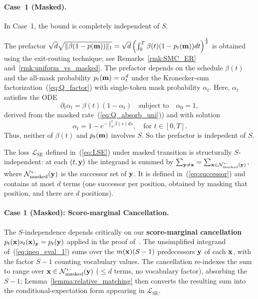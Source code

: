 \documentclass{article} %
\def\eqref#1{equation~\ref{#1}}
\newcommand{\bfx}{{\bf x}}
\newcommand{\bfy}{ {\bf y}}
\newcommand{\bfm}{{\bf m}}
\newcommand{\LSE}{\mathcal{L}_{\mathrm{SE}}}
\renewcommand{\eqref}[1]{\textup{(\ref{#1})}}
\newcommand{\Nmasked}{\mathcal{N}^{\leftarrow}_{\text{masked}}}
\begin{document}
\paragraph{Case~1 (Masked).} In Case~1, the bound is completely independent of $S$.

The prefactor
$\sqrt{d} \sqrt{\| \beta (1-p(\bfm))\|_1} =\sqrt{d} \left( \int_0^T \beta(t) (1-p_t(\bfm)) dt \right)^{\frac{1}{2}} $ is obtained using the exit-routing technique; see Remarks~\ref{rmk:SMC_ER} and~\ref{rmk:uniform_vs_masked}.
The prefactor depends on the
schedule $\beta(t)$ and the all-mask probability $p_t(\bfm) = \alpha_t^d$ under the Kronecker-sum factorization~\eqref{eq:Q_factor} with single-token
mask probability $\alpha_t$. Here, $\alpha_t$ satisfies the ODE
\begin{equation}
    \partial_t \alpha_t = \beta(t)(1 - \alpha_t) \quad \text{subject to} \quad \alpha_0=1,
\end{equation}
derived from the masked rate~\eqref{eq:Q_absorb_uni}) and with solution
\begin{equation}
    \alpha_t = 1-e^{-\int_0^t \beta(s) ds}, \quad \text{for } t\in[0, T].
\end{equation}
Thus, neither of $\beta(t)$ and $p_t(\bfm)$
involves $S$. So the prefactor is indepedent of $S$.

The loss $\LSE$ defined in~\eqref{eq:LSE} under masked transition is structurally $S$-independent: at each $(t, \bfy)$
the integrand is summed by $\sum_{\bfy \neq \bfx}=\sum_{\bfx \in \Nmasked(\bfy)}$, where $\Nmasked(\bfy)$ is the successor set of $\bfy$. It is defined in~\eqref{eq:successor} and contains at most $d$ terms (one successor per position, obtained by masking that position, and there are $d$ positions).

\paragraph{Case 1 (Masked): Score-marginal Cancellation.} The $S$-independence depends critically on our \textbf{score-marginal cancellation}
$p_t(\bfx)s_t(\bfx)_\bfy = p_t(\bfy)$ applied in the proof of~.
The unsimplified integrand of~\eqref{eq:ineq_eval_1} sums over the
$m(\bfx)(S - 1)$ predecessors $\bfy$ of each $\bfx$, with the factor $S-1$
counting vocabulary values. The cancellation re-indexes the sum to range
over $\bfx \in \Nmasked(\bfy)$ ($\le d$ terms, no
vocabulary factor), absorbing the $S-1$; Lemma~\ref{lemma:relative_matching}
then converts the resulting sum into the conditional-expectation form
appearing in $\LSE$.
\end{document}
